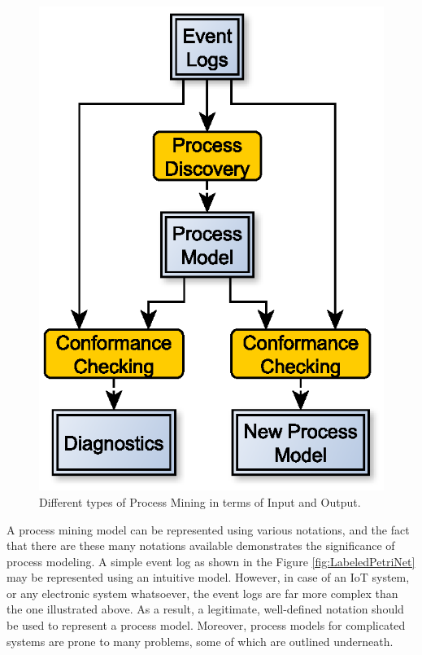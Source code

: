 \begin{figure}[h]
	\centering
	\includegraphics[width=0.6\columnwidth]{images/procesMiningInputOutput.eps}
	\caption{Different types of Process Mining in terms of Input and Output.}
	\label{fig:ProcessMiningInputOutput}
\end{figure}

A process mining model can be represented using various notations, and the fact that there are these many notations available demonstrates the significance of process modeling. A simple event log as shown in the Figure \ref{fig:LabeledPetriNet} may be represented using an intuitive model. However, in case of an IoT system, or any electronic system whatsoever, the event logs are far more complex than the one illustrated above. As a result, a legitimate, well-defined notation should be used to represent a process model. Moreover, process models for complicated systems are prone to many problems, some of which are outlined underneath.

